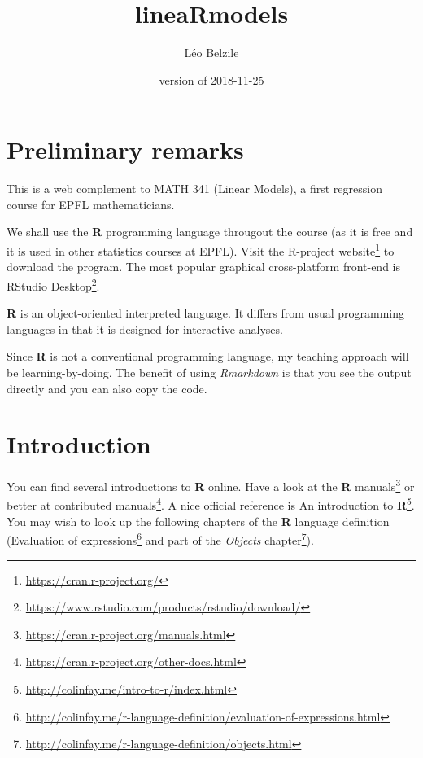 \documentclass[]{book}
\title{lineaRmodels}
\author{Léo Belzile}
\date{version of 2018-11-25}
\let\rmarkdownfootnote\footnote%
\def\footnote{\protect\rmarkdownfootnote}
\renewcommand{\href}[2]{#2\footnote{\url{#1}}}
\theoremstyle{definition}
\theoremstyle{definition}
\theoremstyle{definition}
\theoremstyle{remark}
\begin{document}
\maketitle

{
\setcounter{tocdepth}{1}
\tableofcontents
}
\hypertarget{preliminary-remarks}{%
\chapter*{Preliminary remarks}\label{preliminary-remarks}}

This is a web complement to MATH 341 (Linear Models), a first regression
course for EPFL mathematicians.

We shall use the \textbf{R} programming language througout the course
(as it is free and it is used in other statistics courses at EPFL).
Visit \href{https://cran.r-project.org/}{the R-project website} to
download the program. The most popular graphical cross-platform
front-end is
\href{https://www.rstudio.com/products/rstudio/download/}{RStudio
Desktop}.

\textbf{R} is an object-oriented interpreted language. It differs from
usual programming languages in that it is designed for interactive
analyses.

Since \textbf{R} is not a conventional programming language, my teaching
approach will be learning-by-doing. The benefit of using
\emph{Rmarkdown} is that you see the output directly and you can also
copy the code.

\newcommand{\bs}[1]{\boldsymbol{#1}}
\newcommand{\Hmat}{\mathbf{H}}
\newcommand{\Mmat}{\mathbf{M}}
\newcommand{\mX}{\mathbf{X}}
\newcommand{\bX}{{\mathbf{X}}}
\newcommand{\bx}{{\mathbf{x}}}
\newcommand{\by}{{\boldsymbol{y}}}
\newcommand{\bY}{{\boldsymbol{Y}}}
\newcommand{\eps}{\varepsilon}
\newcommand{\beps}{\boldsymbol{\varepsilon}}
\newcommand{\bbeta}{\boldsymbol{\beta}}
\newcommand{\hbb}{\hat{\boldsymbol{\beta}}}
\newcommand{\limni}{\lim_{n \ra \infty}}
\newcommand{\Sp}{\mathscr{S}}
\newcommand{\E}[2][]{{\mathsf E}_{#1}\left(#2\right)}
\newcommand{\Va}[2][]{{\mathsf{Var}_{#1}}\left(#2\right)}
\newcommand{\I}[1]{{\mathbf 1}_{#1}}

\hypertarget{introduction}{%
\chapter{Introduction}\label{introduction}}

You can find several introductions to \textbf{R} online. Have a look at
the \href{https://cran.r-project.org/manuals.html}{\textbf{R} manuals}
or better at
\href{https://cran.r-project.org/other-docs.html}{contributed manuals}.
A nice official reference is
\href{http://colinfay.me/intro-to-r/index.html}{An introduction to
\textbf{R}}. You may wish to look up the following chapters of the
\textbf{R} language definition
(\href{http://colinfay.me/r-language-definition/evaluation-of-expressions.html}{Evaluation
of expressions} and part of the
\href{http://colinfay.me/r-language-definition/objects.html}{\emph{Objects}
chapter}).
\end{document}
